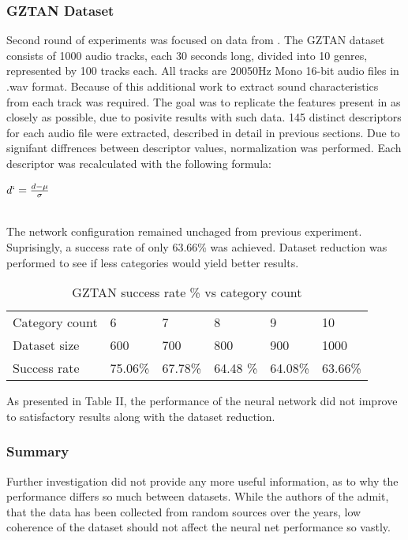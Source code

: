 \subsubsection{GZTAN Dataset}
Second round of experiments was focused on data from \cite{gztan}. The GZTAN dataset consists of 1000 audio tracks, each 30 seconds long, divided into 10 genres, represented by 100 tracks each. All tracks are 20050Hz Mono 16-bit audio files in .wav format. Because of this additional work to extract sound characteristics from each track was required. The goal was to replicate the features present in \cite{data} as closely as possible, due to posivite results with such data. 145 distinct descriptors for each audio file were extracted, described in detail in previous sections. \newline
Due to signifant diffrences between descriptor values, normalization was performed. Each descriptor was recalculated with the following formula:
\begin{center}
	$d` = \frac{d - \mu}{\sigma}  $ \\~\\
\end{center}
The network configuration remained unchaged from previous experiment. Suprisingly, a success rate of only 63.66\% was achieved. Dataset reduction was performed to see if less categories would yield better results. 

\begin{table}[h]
	\centering
	\caption{GZTAN success rate \% vs category count}
	\label{my-label}
	\begin{tabular}{|l|l|l|l|l|l|}
		\cline{1-6}
		Category count & 6 & 7 &  8 & 9 & 10  \\ \cline{1-6}
		Dataset size   & 600 & 700 & 800 & 900 & 1000 \\ \cline{1-6}
		Success rate   & 75.06\% & 67.78\% & 64.48 \% & 64.08\% & 63.66\% \\ \cline{1-6}
	\end{tabular}
\end{table}

As presented in Table II, the performance of the neural network did not improve to satisfactory results along with the dataset reduction.

\subsubsection{Summary} Further investigation did not provide any more useful information, as to why the performance differs so much between datasets. While the authors of the \cite{gztan} admit, that the data has been collected from random sources over the years, low coherence of the dataset should not affect the neural net performance so vastly. 


